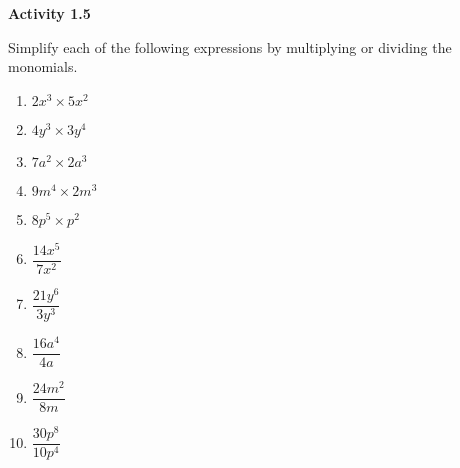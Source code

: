 \vspace{1ex}
\noindent\textbf{Activity 1.5}

\vspace{0.75ex}

Simplify each of the following expressions by multiplying or dividing the monomials.
\begin{multicols}{4}
\begin{enumerate}
    \item \( 2x^3 \times 5x^2 \)
    \item \( 4y^3 \times 3y^4 \)
    \item \( 7a^2 \times 2a^3 \)
    \item \( 9m^4 \times 2m^3 \)
    \item \( 8p^5 \times p^2 \)
    \item \( \dfrac{14x^5}{7x^2} \)
    \item \( \dfrac{21y^6}{3y^3} \)
    \item \( \dfrac{16a^4}{4a} \)
    \item \( \dfrac{24m^2}{8m} \)
    \item \( \dfrac{30p^8}{10p^4} \)
\end{enumerate}
\end{multicols} 